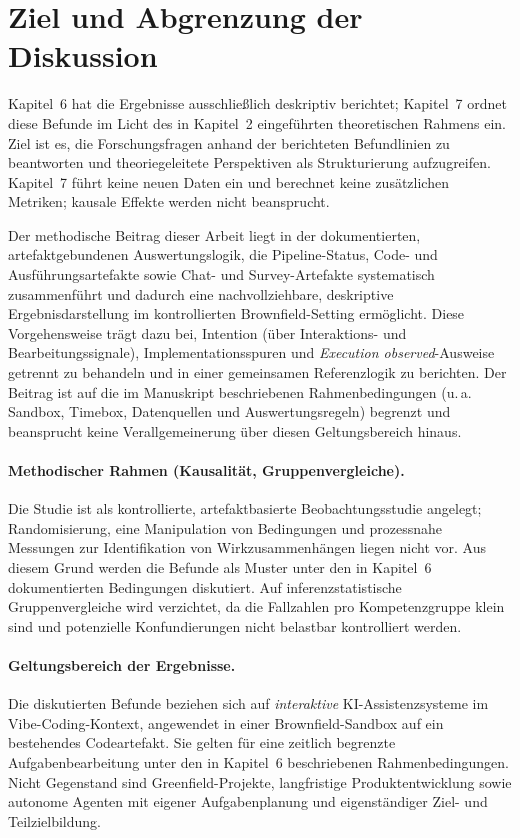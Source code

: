 \section{Ziel und Abgrenzung der Diskussion}
\label{sec:discussion_scope}

Kapitel~6 hat die Ergebnisse ausschlie\ss lich deskriptiv berichtet; Kapitel~7 ordnet diese Befunde im Licht des in Kapitel~2 eingef\"uhrten theoretischen Rahmens ein.
Ziel ist es, die Forschungsfragen anhand der berichteten Befundlinien zu beantworten und theoriegeleitete Perspektiven als Strukturierung aufzugreifen.
Kapitel~7 f\"uhrt keine neuen Daten ein und berechnet keine zus\"atzlichen Metriken; kausale Effekte werden nicht beansprucht.

Der methodische Beitrag dieser Arbeit liegt in der dokumentierten, artefaktgebundenen Auswertungslogik, die Pipeline-Status, Code- und Ausf\"uhrungsartefakte sowie Chat- und Survey-Artefakte systematisch zusammenf\"uhrt und dadurch eine nachvollziehbare, deskriptive Ergebnisdarstellung im kontrollierten Brownfield-Setting erm\"oglicht. Diese Vorgehensweise tr\"agt dazu bei, Intention (\"uber Interaktions- und Bearbeitungssignale), Implementationsspuren und \textit{Execution observed}-Ausweise getrennt zu behandeln und in einer gemeinsamen Referenzlogik zu berichten. Der Beitrag ist auf die im Manuskript beschriebenen Rahmenbedingungen (u.\,a. Sandbox, Timebox, Datenquellen und Auswertungsregeln) begrenzt und beansprucht keine Verallgemeinerung \"uber diesen Geltungsbereich hinaus.

\paragraph{Methodischer Rahmen (Kausalit\"at, Gruppenvergleiche).}
Die Studie ist als kontrollierte, artefaktbasierte Beobachtungsstudie angelegt; Randomisierung, eine Manipulation von Bedingungen und prozessnahe Messungen zur Identifikation von Wirkzusammenh\"angen liegen nicht vor.
Aus diesem Grund werden die Befunde als Muster unter den in Kapitel~6 dokumentierten Bedingungen diskutiert.
Auf inferenzstatistische Gruppenvergleiche wird verzichtet, da die Fallzahlen pro Kompetenzgruppe klein sind und potenzielle Konfundierungen nicht belastbar kontrolliert werden.

\paragraph{Geltungsbereich der Ergebnisse.}
Die diskutierten Befunde beziehen sich auf \emph{interaktive} KI-Assistenzsysteme im Vibe-Coding-Kontext, angewendet in einer Brownfield-Sandbox auf ein bestehendes Codeartefakt.
Sie gelten f\"ur eine zeitlich begrenzte Aufgabenbearbeitung unter den in Kapitel~6 beschriebenen Rahmenbedingungen.
Nicht Gegenstand sind Greenfield-Projekte, langfristige Produktentwicklung sowie autonome Agenten mit eigener Aufgabenplanung und eigenst\"andiger Ziel- und Teilzielbildung.


